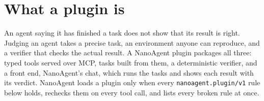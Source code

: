 \section{What a plugin is}

An agent saying it has finished a task does not show that its result is
right. Judging an agent takes a precise task, an environment anyone can
reproduce, and a verifier that checks the actual result. A NanoAgent plugin
packages all three: typed tools served over MCP, tasks built from them, a
deterministic verifier, and a front end, NanoAgent's chat, which runs the
tasks and shows each result with its verdict. NanoAgent loads a plugin only
when every \texttt{nanoagent.plugin/v1} rule below holds, rechecks them on
every tool call, and lists every broken rule at once.
